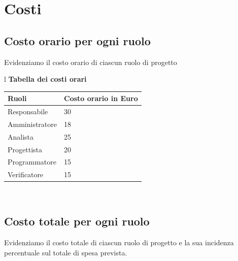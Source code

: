 \documentclass[11pt,titlepage,a4paper]{report}
\begin{document}
\chapter{Costi}
\section{Costo orario per ogni ruolo}
Evidenziamo il costo orario di ciascun ruolo di progetto
\begin{table}[hbtp]
\large{
\begin{tabular}{l}
\Large{\textbf{\textsf{Tabella dei costi orari}}} \\
\begin{tabular}{||p{6cm}||p{5cm}||}
\hline
\textbf{Ruoli} & \textbf{Costo orario in Euro}\\
\hline
{Responsabile}&30\\ 
\hline 
{Amministratore} &18\\ 
\hline
{Analista} &25 \\
\hline
{Progettista} &20 \\
\hline
{Programmatore} &15\\
\hline
{Verificatore} &15 \\
\hline
\end{tabular} \\
\end{tabular}
}
\end{table}

\section{Costo totale per ogni ruolo}
Evidenziamo il costo totale di ciascun ruolo di progetto e la sua incidenza
percentuale sul totale di spesa prevista.
\end{document}
